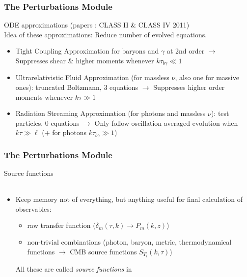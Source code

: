 \begin{frame}[fragile]
	\frametitle{The Perturbations Module}
	
	ODE approximations (papers : CLASS II \& CLASS IV 2011)\\
	
	Idea of these approximations: Reduce number of evolved equations.
	
	\begin{itemize}
		\item Tight Coupling Approximation for baryons and $\gamma$ at 2nd order $\rightarrow$ Suppresses shear \& higher moments whenever $k \tau_{b \gamma} \ll 1$
		\item Ultrarelativistic Fluid Approximation (for massless $\nu$, also one for massive ones): truncated Boltzmann, 3 equations $\rightarrow$ Suppresses higher order moments whenever $k \tau \gg 1$\\
		\item Radiation Streaming Approximation (for photons and massless $\nu$): test particles, 0 equations $\rightarrow$ Only follow oscillation-averaged evolution when $k \tau \gg \ell$ (+ for photons $k \tau_{b \gamma} \gg 1$)
	\end{itemize}
	
	\vspace*{-1\baselineskip}
	
\end{frame}



\begin{frame}[fragile]
\frametitle{The Perturbations Module}

Source functions \\
\mbox{}\\
\begin{itemize}
\item \scriptsize Keep memory not of everything, but anything useful for final calculation of observables: 
\begin{itemize}
\item \scriptsize raw transfer function ($\delta_m(\tau,k) \rightarrow P_m(k,z)$)
\item \scriptsize non-trivial combinations (photon, baryon, metric, thermodynamical functions $\rightarrow$ CMB source functions $S_{T_i}(k,\tau)$) 
\end{itemize}
All these are called {\it source functions} in {\Red \CLASS{}} 
\end{itemize}

\end{frame}


